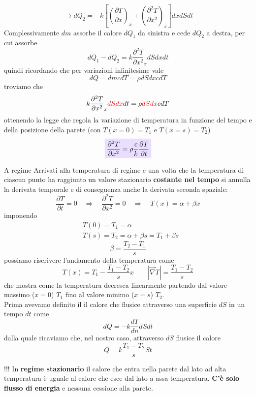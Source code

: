 \documentclass[x11names]{report}
\newcommand{\viola}[1]{\colorbox{yred}{$\displaystyle #1$}}
\begin{document}
	\[ 
	\to dQ_2 = -k\left[\left(\frac{\partial T}{\partial x}\right)_x + \left(\frac{\partial^2 T}{\partial x^2}\right)_{x}\right]dxdSdt
	\]
	Complessivamente \(dm\) assorbe il calore \(dQ_1\) da sinistra e cede \(dQ_2\) a destra, per cui assorbe 
	\[ 
	dQ_1 - dQ_2  = k\frac{\partial^2 T}{\partial x^2}_{x}dSdx dt
	\]
	quindi ricordando che per variazioni infinitesime vale
	\[ 
	dQ = dmcdT = \rho dS dx c dT
	\]
	troviamo che 
	\[ 
	k\frac{\partial^2 T}{\partial x^2}_{x}\textcolor{red}{dSdx} dt = \rho  \textcolor{red}{dSdx} c dT
	\]
	ottenendo la legge che regola la variazione di temperatura in funzione del tempo e della posizione della parete (con \(T(x=0) = T_1\) e \(T(x = s) = T_2\))
	\begin{equation}
		\viola{\frac{\partial^2 T}{\partial x^2} = \rho \frac{c}{k} \frac{\partial T}{\partial t}}
	\end{equation}
	\begin{es}{A regime}
		Arrivati alla temperatura di regime e una volta che la temperatura di ciascun punto ha raggiunto un valore stazionario \textbf{costante nel tempo} si annulla la derivata temporale e di conseguenza anche la derivata seconda spaziale:
		\[ 
		\frac{\partial T}{\partial t} = 0 \quad \Rightarrow \quad \frac{\partial^2 T}{\partial x^2} = 0\quad \Rightarrow \quad T(x) = \alpha + \beta x
		\]
		imponendo
		\begin{align*}
			&T(0) = T_1 = \alpha  \\
			&T(s) = T_2 = \alpha + \beta s = T_1 + \beta s
		\end{align*}
		\[ 
		\beta = \frac{T_2 - T_1}{s} 
		\]
		possiamo riscrivere l'andamento della temperatura come
		\[ 
		T(x) = T_1 - \frac{T_1 - T_2}{s}x \qquad |\overrightarrow{\nabla}T |= \frac{T_1 - T_2}{s}
		\]
		che mostra come la temperatura decresca linearmente partendo dal valore massimo (\(x=0\)) \(T_1\) fino al valore minimo (\(x=s\)) \(T_2\). \\
		
		Prima avevamo definito il il calore che flusice attraverso una superficie \(dS\) in un tempo \(dt\) come
		\[ 
		dQ = -k\frac{dT}{dn}dS dt
		\]
		dalla quale ricaviamo che, nel nostro caso, attraverso \(dS\) flusice il calore 
		\[ 
		Q = k\frac{T_1 - T_2}{s}St
		\]
		\begin{center}
			\colorbox{attenzione}{\begin{minipage}{5in}
					\begin{attenzione}{!!!}
						In \textbf{regime stazionario} il calore che entra nella parete dal lato ad alta temperatura è uguale al calore che esce dal lato a assa temperatura. \textbf{C'è solo flusso di energia} e nessuna cessione alla parete.
					\end{attenzione}
			\end{minipage}}
		\end{center}
	\end{es}
	
\end{document}
